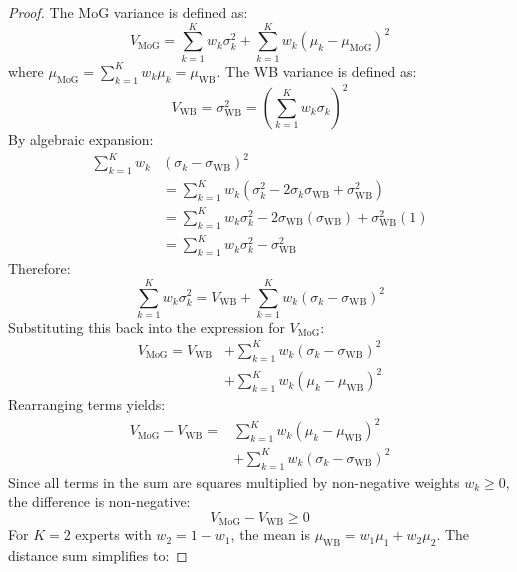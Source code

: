 \documentclass{article}
\theoremstyle{plain}
\theoremstyle{definition}
\theoremstyle{remark}
\begin{document}
\begin{proof}
The MoG variance is defined as:
\begin{equation}
  V_{\text{MoG}} = \sum_{k=1}^K w_k \sigma_k^2 + \sum_{k=1}^K w_k (\mu_k - \mu_{\text{MoG}})^2
\end{equation}
where $\mu_{\text{MoG}} = \sum_{k=1}^K w_k \mu_k = \mu_{\text{WB}}$.
The WB variance is defined as:
\begin{equation}
  V_{\text{WB}} = \sigma^2_{\text{WB}} = \left( \sum_{k=1}^K w_k \sigma_k \right)^2
\end{equation}
By algebraic expansion:
\begin{align}
  \sum_{k=1}^K w_k &(\sigma_k - \sigma_{\text{WB}})^2 \nonumber \\
  &= \sum_{k=1}^K w_k \left( \sigma_k^2 - 2 \sigma_k \sigma_{\text{WB}} + \sigma_{\text{WB}}^2 \right) \\
  &= \sum_{k=1}^K w_k \sigma_k^2 - 2 \sigma_{\text{WB}} (\sigma_{\text{WB}}) + \sigma_{\text{WB}}^2 (1) \\
  &= \sum_{k=1}^K w_k \sigma_k^2 - \sigma_{\text{WB}}^2
\end{align}
Therefore:
\begin{equation}
  \sum_{k=1}^K w_k \sigma_k^2 = V_{\text{WB}} + \sum_{k=1}^K w_k (\sigma_k - \sigma_{\text{WB}})^2
\end{equation}
Substituting this back into the expression for $V_{\text{MoG}}$:
\begin{equation}
\begin{split}
  V_{\text{MoG}} = V_{\text{WB}} &+ \sum_{k=1}^K w_k (\sigma_k - \sigma_{\text{WB}})^2 \\
  &+ \sum_{k=1}^K w_k (\mu_k - \mu_{\text{WB}})^2
\end{split}
\end{equation}
Rearranging terms yields:
\begin{equation}
\begin{split}
  V_{\text{MoG}} - V_{\text{WB}} = &\sum_{k=1}^K w_k (\mu_k - \mu_{\text{WB}})^2 \\
  &+ \sum_{k=1}^K w_k (\sigma_k - \sigma_{\text{WB}})^2
\end{split}
\end{equation}
Since all terms in the sum are squares multiplied by non-negative weights $w_k \geq 0$, the difference is non-negative:
\begin{equation}
  V_{\text{MoG}} - V_{\text{WB}} \geq 0
\end{equation}
For $K=2$ experts with $w_2 = 1 - w_1$, the mean is $\mu_{\text{WB}} = w_1 \mu_1 + w_2 \mu_2$. The distance sum simplifies to:

\end{proof}
\end{document}
